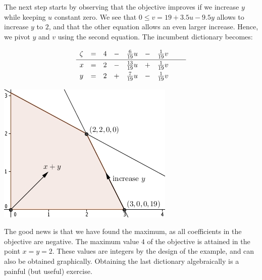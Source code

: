 \documentclass[ukenglish]{nik}
\begin{document}
The next step
starts by observing that the objective improves if we 
increase $y$ while keeping $u$ constant zero. We see that
$0\leq v = 19 + 3.5u - 9.5y$ allows to increase $y$ to $2$,
and that the other equation allows an even larger increase.
Hence, we pivot $y$ and $v$ using the second equation.
The incumbent dictionary becomes:
\vspace{.2cm}
	\begin{minipage}{.45\textwidth}
\[    
    \begin{array}{lcrcrcrcr}
      \zeta&=& 4 &-& \frac{6}{19} u &-& \frac{1}{19} v &\vphantom{\frac{|}{|}} &  \\\hline
      x    &=& 2 &-&\frac{13}{19} u &+& \frac{1}{19} v &\vphantom{\frac{|}{|}} &  \\
      y    &=& 2 &+& \frac{7}{19} u &-& \frac{1}{19} v &\vphantom{\frac{|}{|}} &  \\
    \end{array}
\]
\end{minipage}
	\begin{minipage}{.45\textwidth}
				\includegraphics{ex3.jpg}
\end{minipage}
\vspace{.2cm}

The good news is that we have found the maximum, as all coefficients in the objective
are negative. The maximum value $4$
of the objective is attained in the point $x=y=2$. These values are 
integers by the design of the example, and can also be obtained graphically.
Obtaining the last dictionary algebraically is a painful (but useful) exercise.
\end{document}
